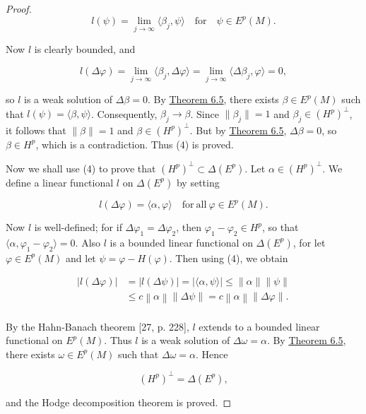 \begin{proof}
\begin{equation}
\tag{5}\label{eq:6.8:5}
l(\psi)=\lim_{j\to\infty}\langle\beta_{j},\psi\rangle\quad\mathrm{for}\quad\psi\in E^{p}(M).
\end{equation}

Now $l$ is clearly bounded, and

\begin{equation}
\tag{6}\label{eq:6.8:6}
l(\Delta\varphi)=\lim_{j\to\infty}\langle\beta_{j},\Delta\varphi\rangle=\lim_{j\to\infty}\langle\Delta\beta_{j},\varphi\rangle=0,
\end{equation}

so $l$ is a weak solution of $\Delta\beta = 0$. By \hyperref[thm:6.5]{Theorem 6.5}, there exists $\beta \in E^p(M)$ such that $l(\psi) = \langle \beta, \psi \rangle$. Consequently, $\beta_j \to \beta$. Since $\|\beta_j\| = 1$ and $\beta_j \in (H^p)^\perp$, it follows that $\|\beta\| = 1$ and $\beta \in (H^p)^\perp$. But by \hyperref[thm:6.5]{Theorem 6.5}, $\Delta\beta = 0$, so $\beta \in H^p$, which is a contradiction. Thus (4) is proved.

Now we shall use (4) to prove that $(H^p)^\perp \subset \Delta(E^p)$. Let $\alpha \in (H^p)^\perp$. We define a linear functional $l$ on $\Delta(E^p)$ by setting

\begin{equation}
\tag{7}\label{eq:6.8:7}
l(\Delta\varphi)=\langle\alpha,\varphi\rangle\quad\mathrm{for\ all}\ \varphi\in E^{p}(M).
\end{equation}

Now $l$ is well-defined; for if $\Delta\varphi_1 = \Delta\varphi_2$, then $\varphi_1 - \varphi_2 \in H^p$, so that $\langle \alpha, \varphi_1 - \varphi_2 \rangle = 0$. Also $l$ is a bounded linear functional on $\Delta(E^p)$, for let $\varphi \in E^p(M)$ and let $\psi = \varphi - H(\varphi)$. Then using (4), we obtain

\begin{equation}
\tag{8}\label{eq:6.8:8}
\begin{aligned}{|l(\Delta\varphi)|}&{{}=|l(\Delta\psi)|=|\langle\alpha,\psi\rangle|\leq\|\alpha\|\|\psi\|}\\ {}&{{}\leq c\left\|\alpha\right\|\|\Delta\psi\|=c\left\|\alpha\right\|\|\Delta\varphi\|.}\\ \end{aligned}
\end{equation}

By the Hahn-Banach theorem [27, p. 228], $l$ extends to a bounded linear functional on $E^p(M)$. Thus $l$ is a weak solution of $\Delta\omega = \alpha$. By \hyperref[thm:6.5]{Theorem 6.5}, there exists $\omega \in E^p(M)$ such that $\Delta\omega = \alpha$. Hence

\begin{equation}
\tag{9}\label{eq:6.8:9}
(H^{p})^{\perp}=\Delta(E^{p}),
\end{equation}

and the Hodge decomposition theorem is proved.

\end{proof}

